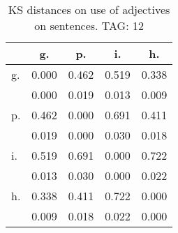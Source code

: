 \begin{table}[h!]
\begin{center}
\begin{tabular}{| l | c | c | c | c |}\hline
 & g. & p. & i. & h. \\\hline
g. & 0.000  & 0.462  & 0.519  & 0.338 \\\hline
 & 0.000  & 0.019  & 0.013  & 0.009 \\\hline
p. & 0.462  & 0.000  & 0.691  & 0.411 \\\hline
 & 0.019  & 0.000  & 0.030  & 0.018 \\\hline
i. & 0.519  & 0.691  & 0.000  & 0.722 \\\hline
 & 0.013  & 0.030  & 0.000  & 0.022 \\\hline
h. & 0.338  & 0.411  & 0.722  & 0.000 \\\hline
 & 0.009  & 0.018  & 0.022  & 0.000 \\\hline
\end{tabular}
\caption{KS distances on use of adjectives on sentences. TAG: 12}
\end{center}
\end{table}